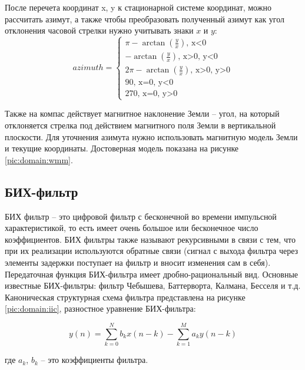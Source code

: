 После перечета координат x, y к стационарной системе координат, можно рассчитать азимут, 
а также чтобы преобразовать полученный азимут как угол отклонения часовой стрелки нужно 
учитывать знаки $x$ и $y$:
\begin{equation}
    azimuth =
    \begin{cases}
      \pi - \arctan\left(\frac{y}{x}\right) \text{, x<0}\\      
      - \arctan\left(\frac{y}{x}\right) \text{, x>0, y<0} \\
      2\pi - \arctan\left(\frac{y}{x}\right) \text{, x>0, y>0} \\
      90 \text{, x=0, y<0} \\
      270 \text{, x=0, y>0}
    \end{cases}
\end{equation}

Также на компас действует магнитное наклонение Земли -- угол, на который отклоняется стрелка под действием 
магнитного поля Земли в вертикальной плоскости. Для уточнения азимута нужно использовать магнитную модель Земли
и текущие координаты.
Достоверная модель показана на рисунке \ref{pic:domain:wmm}.

\subsection{БИХ-фильтр}
БИХ фильтр  -- это цифровой фильтр с
бесконечной во времени импульсной характеристикой, 
то есть имеет очень большое или бесконечное число коэффициентов. БИХ фильтры также 
называют рекурсивными в связи с тем, что при их
реализации используются обратные связи (сигнал с выхода фильтра через элементы задержки 
поступает на фильтр и вносит изменения сам в себя). 
Передаточная функция БИХ-фильтра имеет дробно-рациональный вид. Основные известные БИХ-фильтры: 
фильтр Чебышева, Баттерворта, Калмана, Бесселя и т.д.
Каноническая структурная схема фильтра представлена на рисунке \ref{pic:domain:iic}, разностное уравнение БИХ-фильтра:

\begin{equation}
    \label{eq:domain:eqIIC}
    y(n) = \sum_{k=0}^{N}b_{k}x(n-k) - \sum_{k=1}^{M}a_{k}y(n-k)
    \end{equation}
    \begin{explanationx}
        \item[где] $a_{k}$, $b_{k}$  -- это коэффициенты фильтра.
      \end{explanationx} 

